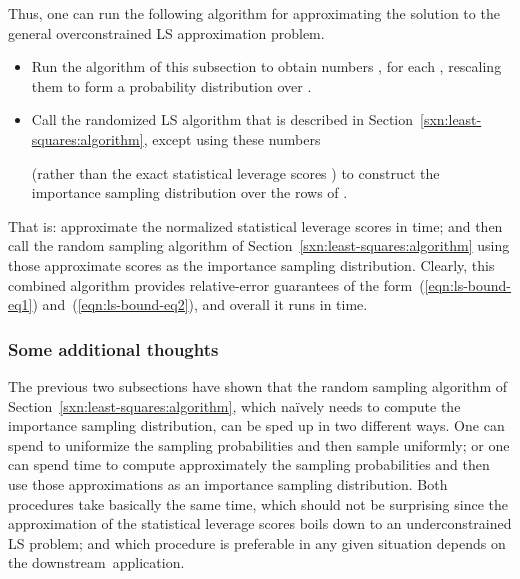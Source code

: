 \documentclass[twoside]{article}
\begin{document}
Thus, one can run the following algorithm for approximating the solution to 
the general overconstrained LS approximation problem.
\begin{itemize}
\item
Run the algorithm of this subsection to obtain numbers
, for each , rescaling them to form a 
probability distribution over .
\item
Call the randomized LS algorithm that is described in 
Section~\ref{sxn:least-squares:algorithm}, except using these numbers 

(rather than the exact statistical leverage scores ) to construct the importance 
sampling distribution over the rows of .
\end{itemize}
That is: approximate the normalized statistical leverage scores in  
time; and then call the random sampling algorithm of 
Section~\ref{sxn:least-squares:algorithm} using those approximate scores 
as the importance sampling distribution.  
Clearly, this combined algorithm provides relative-error guarantees of the 
form~(\ref{eqn:ls-bound-eq1}) and~(\ref{eqn:ls-bound-eq2}), and overall it 
runs in  time.


\subsubsection{Some additional thoughts}
\label{sxn:least-squares:faster-th:addl}

The previous two subsections have shown that the random sampling algorithm of 
Section~\ref{sxn:least-squares:algorithm}, which na\"{i}vely needs  
to compute the importance sampling distribution, can be sped up in two 
different ways.
One can spend  to uniformize the sampling probabilities and then 
sample uniformly; or one can spend  time to compute approximately 
the sampling probabilities and then use those approximations as an 
importance sampling distribution. 
Both procedures take basically the same time, which should not be surprising 
since the approximation of the statistical leverage scores boils down to an 
underconstrained LS problem; and which procedure is preferable in any 
given situation depends on 
the downstream~application.
\end{document}
